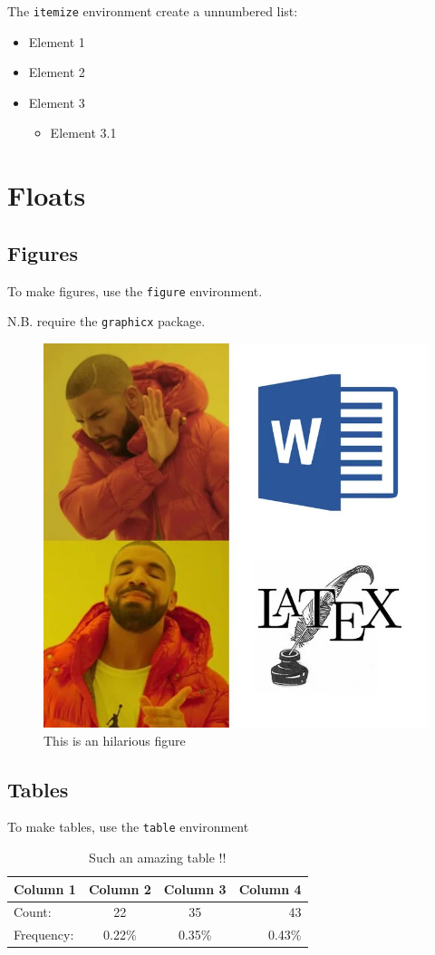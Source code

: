 \documentclass{article}
\begin{document}
The \texttt{itemize} environment create a unnumbered list:
\begin{itemize}
    \item Element 1  
    \item Element 2
    \item Element 3
    \begin{itemize}
        \item Element 3.1
    \end{itemize}
\end{itemize}




\section{Floats}

\subsection{Figures}
To make figures, use the \texttt{figure} environment.

N.B. require the \texttt{graphicx} package.

\begin{figure}[ht] %
    \centering
    \includegraphics[width=0.4\linewidth]{image1.jpg}
    \caption{This is an hilarious figure}
    \label{fig:image1}
\end{figure}


\subsection{Tables}
To make tables, use the \texttt{table} environment

\begin{table}[ht] 
    \centering
    \begin{tabular}{|l|c|c|r|} 
    \hline
        Column 1   & Column 2 & Column 3 & Column 4 \\ \hline
        Count:     &    22    &   35   &    43      \\ \hline
        Frequency: &  0.22\%  & 0.35\% &  0.43\%    \\ \hline
    \end{tabular}
    \caption{Such an amazing table !!}
    \label{tab:table1}
\end{table}
\end{document}

